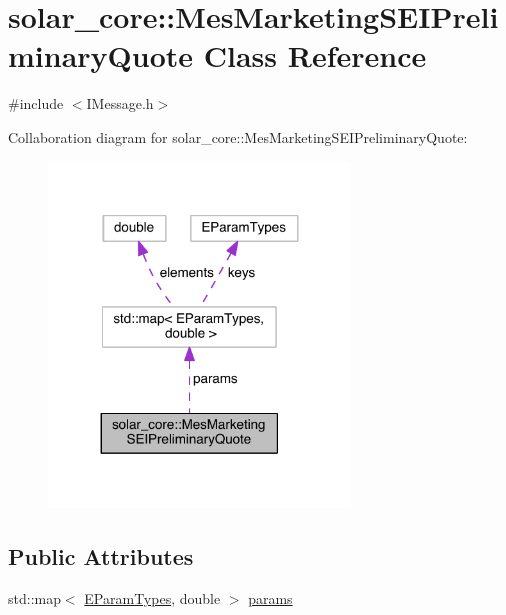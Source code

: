 \hypertarget{classsolar__core_1_1_mes_marketing_s_e_i_preliminary_quote}{}\section{solar\+\_\+core\+:\+:Mes\+Marketing\+S\+E\+I\+Preliminary\+Quote Class Reference}
\label{classsolar__core_1_1_mes_marketing_s_e_i_preliminary_quote}


{\ttfamily \#include $<$I\+Message.\+h$>$}



Collaboration diagram for solar\+\_\+core\+:\+:Mes\+Marketing\+S\+E\+I\+Preliminary\+Quote\+:
\nopagebreak
\begin{figure}[H]
\begin{center}
\leavevmode
\includegraphics[width=227pt]{classsolar__core_1_1_mes_marketing_s_e_i_preliminary_quote__coll__graph}
\end{center}
\end{figure}
\subsection*{Public Attributes}
\begin{DoxyCompactItemize}
\item 
std\+::map$<$ \hyperlink{namespacesolar__core_aa1147341e5ef7a40d68d1bd68e149362}{E\+Param\+Types}, double $>$ \hyperlink{classsolar__core_1_1_mes_marketing_s_e_i_preliminary_quote_abe529e6fd227f28d2aab0c6df56e998d}{params}
\end{DoxyCompactItemize}


